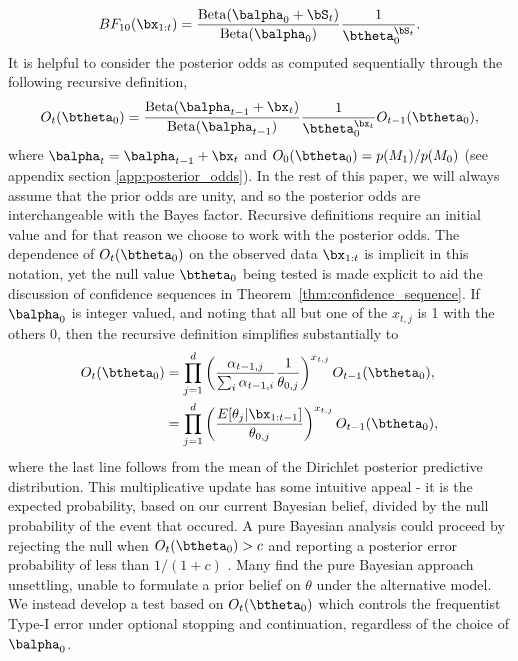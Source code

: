 \documentclass[11pt]{article}
\newcommand{\Beta}{\mathrm{Beta}}
\begin{document}
\begin{equation}
  \label{eq:simplified_bayes_factor}
 BF_{10}(\bx_{1:t}) = \frac{\Beta(\balpha_0 + \bS_t)}{\Beta(\balpha_0)}\frac{1}{\btheta_0^{\bS_t}}.
\end{equation}
It is helpful to consider the posterior odds as computed sequentially through the following recursive definition,
\begin{equation}
  \label{eq:update_rule}
  O_{t}(\btheta_0) = \frac{\Beta(\balpha_{t-1} + \bx_t)}{\Beta(\balpha_{t-1})}\frac{1}{\btheta_0^{\bx_t}} O_{t-1}(\btheta_0),
\end{equation}
where $\balpha_t = \balpha_{t-1}+\bx_t$ and $O_0(\btheta_0)=p(M_1)/p(M_0)$ (see appendix section \ref{app:posterior_odds}).
In the rest of this paper, we will always assume that the prior odds are unity, and so the posterior odds are interchangeable with the Bayes factor.
Recursive definitions require an initial value and for that reason we choose to work with the posterior odds.
The dependence of $O_t(\btheta_0)$ on the observed data $\bx_{1:t}$ is implicit in this notation, yet the null value $\btheta_0$ being tested is made explicit to aid the discussion of confidence sequences in Theorem~\ref{thm:confidence_sequence}.
If $\balpha_0$ is integer valued, and noting that all but one of the $x_{t,j}$ is 1 with the others 0, then the recursive definition simplifies substantially to
\begin{align}
  \label{eq:simplified_bayes_factor}
  O_{t}(\btheta_0) &= \prod_{j=1}^{d} \left(\frac{\alpha_{t-1,j}}{\sum_i \alpha_{t-1,i}} \frac{1}{\theta_{0,j}}\right)^{x_{t,j}} O_{t-1}(\btheta_0),\\
  &=\prod_{j=1}^{d}\left(\frac{E[\theta_j|\bx_{1:t-1}]}{\theta_{0,j}} \right)^{x_{t,j}} O_{t-1}(\btheta_0),
\end{align}
where the last line follows from the mean of the Dirichlet posterior predictive distribution.
This multiplicative update has some intuitive appeal - it is the expected probability, based on our current Bayesian belief, divided by the null probability of the event that occured.
A pure Bayesian analysis could proceed by rejecting the null when $O_t(\btheta_0) > c$ and reporting a posterior error probability of less than $1/(1+c)$ \citep[Chapter 5]{bernardo}.
Many find the pure Bayesian approach unsettling, unable to formulate a prior belief on $\theta$ under the alternative model.
We instead develop a test based on $O_t(\btheta_0)$ which controls the frequentist Type-I error under optional stopping and continuation, regardless of the choice of $\balpha_0$.
\end{document}
